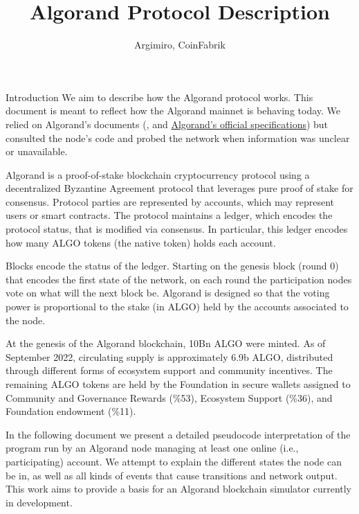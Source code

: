 \documentclass[10pt,a4paper]{article}
\author{Argimiro, CoinFabrik}
\title{Algorand Protocol Description}
\begin{document}
\maketitle
\tableofcontents

\begin{section}{Introduction}
We aim to describe how the Algorand protocol works. 
This document is meant to reflect how the Algorand mainnet is behaving
today. We relied on Algorand's documents (\cite{DBLP:conf/sosp/GiladHMVZ17},
\cite{DBLP:journals/corr/Micali16} and
\href{https://github.com/algorandfoundation/specs}{Algorand's official specifications})
but consulted the node's code and probed the network when information was unclear or
unavailable.

Algorand is a proof-of-stake blockchain cryptocurrency protocol 
using a decentralized By\-zan\-tine Agreement protocol that leverages 
pure proof of stake for consensus. 
Protocol parties are represented by accounts, which may represent users
or smart contracts. 
The protocol maintains a ledger, which encodes the protocol status,
that is modified via consensus.
In particular, this ledger encodes how many {\sf ALGO tokens} 
(the native token) holds each account.

Blocks encode the status of the ledger. Starting on the genesis
block (round 0) that encodes the first state of the network, 
on each round the participation nodes vote on what will the next
block be. Algorand is designed so that the voting power is proportional
to the stake (in ALGO) held by the accounts associated to the node.

At the genesis of the Algorand blockchain, 10Bn ALGO were minted. 
As of September 2022, circulating supply is approximately 6.9b ALGO, 
distributed through different forms of ecosystem support and 
community incentives. 
The remaining ALGO tokens are held by the Foundation in secure wallets 
assigned to 
Community and Governance Rewards (\%53), 
Ecosystem Support (\%36), and 
Foundation endowment (\%11).

In the following document we present a detailed pseudocode interpretation 
of the program run by an Algorand node managing at least one online (i.e., 
participating) account. We attempt to explain the different states the node 
can be in, as well as all kinds of events that cause transitions and network 
output. This work aims to provide a basis for an Algorand blockchain simulator 
currently in development. 

\end{section}
\end{document}
